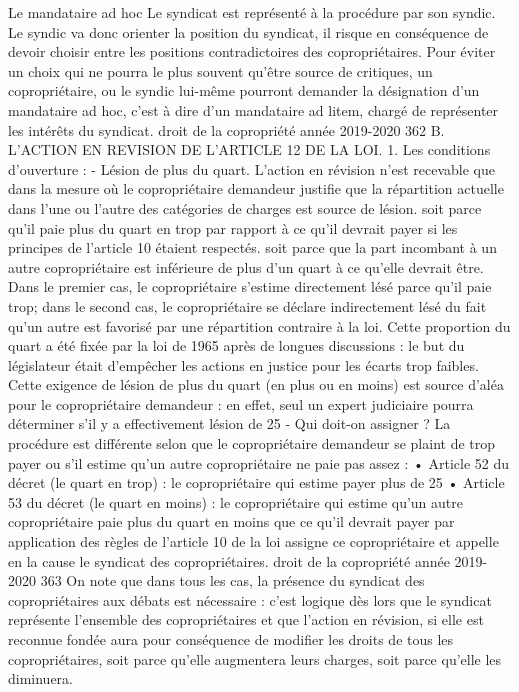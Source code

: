 Le mandataire ad hoc
Le syndicat est représenté à la procédure par son syndic. Le syndic va donc orienter la position du syndicat, il risque en conséquence de devoir choisir entre les positions contradictoires des copropriétaires. Pour éviter un choix qui ne pourra le plus souvent qu'être source de critiques, un copropriétaire, ou le syndic lui-même pourront demander la désignation d'un mandataire ad hoc, c'est à dire d'un mandataire ad litem, chargé de représenter les intérêts du syndicat.
droit de la copropriété année 2019-2020
362
B. L'ACTION EN REVISION DE L'ARTICLE 12 DE LA LOI.
1. Les conditions d'ouverture :
- Lésion de plus du quart.
L'action en révision n'est recevable que dans la mesure où le copropriétaire demandeur justifie que la répartition actuelle dans l'une ou l'autre des catégories de charges est source de lésion.
soit parce qu'il paie plus du quart en trop par rapport à ce qu'il devrait payer si les principes de l'article 10 étaient respectés.
soit parce que la part incombant à un autre copropriétaire est inférieure de plus d'un quart à ce qu'elle devrait être.
Dans le premier cas, le copropriétaire s'estime directement lésé parce qu'il paie trop; dans le second cas, le copropriétaire se déclare indirectement lésé du fait qu'un autre est favorisé par une répartition contraire à la loi.
Cette proportion du quart a été fixée par la loi de 1965 après de longues discussions : le but du législateur était d'empêcher les actions en justice pour les écarts trop faibles.
Cette exigence de lésion de plus du quart (en plus ou en moins) est source d'aléa pour le copropriétaire demandeur : en effet, seul un expert judiciaire pourra déterminer s'il y a effectivement lésion de 25 %
- Qui doit-on assigner ?
La procédure est différente selon que le copropriétaire demandeur se plaint de trop payer ou s'il estime qu'un autre copropriétaire ne paie pas assez :
• Article 52 du décret (le quart en trop) : le copropriétaire qui estime payer plus de 25 %
• Article 53 du décret (le quart en moins) : le copropriétaire qui estime qu'un autre copropriétaire paie plus du quart en moins que ce qu'il devrait payer par application des règles de l'article 10 de la loi assigne ce copropriétaire et appelle en la cause le syndicat des copropriétaires.
droit de la copropriété année 2019-2020
363
On note que dans tous les cas, la présence du syndicat des copropriétaires aux débats est nécessaire : c'est logique dès lors que le syndicat représente l'ensemble des copropriétaires et que l'action en révision, si elle est reconnue fondée aura pour conséquence de modifier les droits de tous les copropriétaires, soit parce qu'elle augmentera leurs charges, soit parce qu'elle les diminuera.
